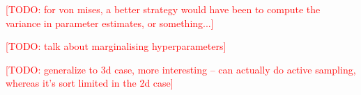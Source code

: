 \documentclass{article} %
\newcommand{\TODO}[1]{\textcolor{red}{[TODO: #1]}}
\begin{document}
\TODO{for von mises, a better strategy would have been to compute the
  variance in parameter estimates, or something...}

\TODO{talk about marginalising hyperparameters}

\TODO{generalize to 3d case, more interesting -- can actually do
  active sampling, whereas it's sort limited in the 2d case}

\renewcommand\refname{\normalsize{References}}


\end{document}
